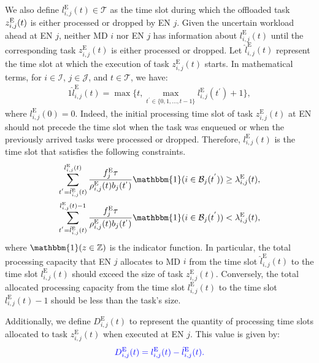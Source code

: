\documentclass[10pt, journal,letterpaper]{IEEEtran}
\begin{document}
We also define $l_{i,j}^{\text{E}}(t) \in \mathcal{T}$ as the time slot during which the offloaded task $z_{i,j}^{\text{\text{E}}}(t)$ is either processed or dropped by EN $j$. Given the uncertain workload ahead at EN $j$, neither MD $i$ nor EN $j$ has information about $l_{i,j}^{\text{E}}(t)$ until the corresponding task $z_{i,j}^{\text{E}}(t)$ is either processed or dropped. Let $\hat{l}_{i,j}^{\text{E}}(t)$ represent the time slot at which the execution of task $z_{i,j}^{\text{E}}(t)$ starts. In mathematical terms, for $i \in \mathcal{I}$, $j \in \mathcal{J}$, and $t \in \mathcal{T}$, we have:
\begin{alignat}{1}
	\hat{l}_{i,j}^{\text{E}}(t) = \max \{t, \max \limits_{t^{'} \in \{0,1,\ldots,t-1\}} l_{i,j}^{\text{E}}(t^{'})+1\},
	\label{11}  
\end{alignat}
where $l_{i,j}^{\text{E}}(0) = 0$. Indeed, the initial processing time slot of task $z_{i,j}^{\text{E}}(t)$ at EN should not precede the time slot when the task was enqueued or when the previously arrived tasks were processed or dropped. Therefore, $l_{i,j}^{\text{E}}(t)$ is the time slot that satisfies the following constraints. %
\begin{alignat}{1}
	\sum_{t^{'}=\hat{l}_{i,j}^{\text{E}}(t)}^{l_{i,j}^{\text{E}}(t)}{f_j^{\text{E}}\tau \over \rho_{i,j}^{\text{E}}(t)b_j(t^{'})}\mathbbm{1}(i \in \mathcal{B}_j(t^{'}))  \geq   \lambda_{i,j}^{\text{E}}(t),
	\label{12}  \\
	\sum_{t^{'}=\hat{l}_{i,j}^{\text{E}}(t)}^{l_{i,j}^{\text{E}}(t)-1}{f_j^{\text{E}}\tau \over \rho_{i,j}^{\text{E}}(t)b_j(t^{'})}\mathbbm{1}(i \in \mathcal{B}_j(t^{'})) < \lambda_{i,j}^{\text{E}}(t),
	\label{13}  
\end{alignat}
where $\mathbbm{1} (z \in \mathbb{Z})$ is the indicator function. In particular, the total processing capacity that EN $j$ allocates to MD $i$ from the time slot $\hat{l}_{i,j}^{\text{E}}(t)$ to the time slot $l_{i,j}^{\text{E}}(t)$ should exceed the size of task $z_{i,j}^{\text{E}}(t)$. Conversely, the total allocated processing capacity from the time slot $l_{i,j}^{\text{E}}(t)$ to the time slot $l_{i,j}^{\text{E}}(t)-1$ should be less than the task's size.

Additionally, we define $D_{i,j}^{\text{E}}(t)$ to represent the quantity of processing time slots allocated to task $z_{i,j}^{\text{E}}(t)$ when executed at EN $j$. This value is given by:
\begin{alignat}{1}
		\textcolor{blue}{D_{i,j}^{\text{E}}(t) =  l_{i,j}^{\text{E}}(t)-\hat{l}_{i,j}^{\text{E}}(t).}
	\label{14}  
\end{alignat}
\end{document}
